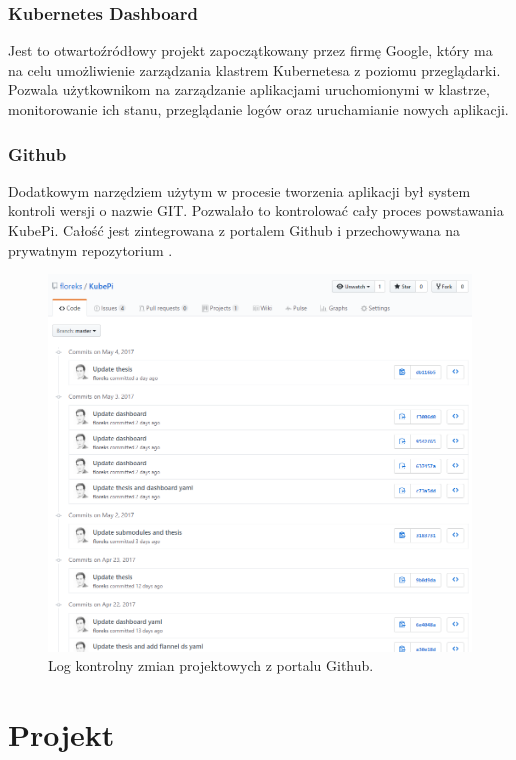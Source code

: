 \documentclass[12pt]{report}
\let\Oldsection\section
\renewcommand{\section}{\FloatBarrier\Oldsection}
\let\Oldsubsubsection\subsubsection
\renewcommand{\subsubsection}{\FloatBarrier\Oldsubsubsection}
\begin{document}
{\subsubsection{Kubernetes Dashboard}
Jest to otwartoźródłowy projekt zapoczątkowany przez firmę Google, który ma na celu umożliwienie zarządzania klastrem Kubernetesa z poziomu przeglądarki. Pozwala użytkownikom na zarządzanie aplikacjami uruchomionymi w klastrze, monitorowanie ich stanu, przeglądanie logów oraz uruchamianie nowych aplikacji.
\subsubsection{Github}
Dodatkowym narzędziem użytym w procesie tworzenia aplikacji był system kontroli wersji o nazwie GIT. Pozwalało to kontrolować cały proces powstawania KubePi. Całość jest zintegrowana z portalem Github i przechowywana na prywatnym repozytorium \cite{kubepi}.
\begin{figure}[h]
	\centering
	\includegraphics[width=1\textwidth]{images/github.png}
	\caption{Log kontrolny zmian projektowych z portalu Github.}
\end{figure}
\FloatBarrier
\clearpage

\section{Projekt}
}
\end{document}
